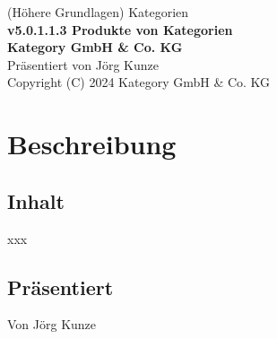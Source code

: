 \documentclass[a4paper]{amsart}
\theoremstyle{definition}
\begin{document}
\begin{titlepage}
\centering
{\huge
(Höhere Grundlagen) Kategorien\\[1cm]
\textbf{v5.0.1.1.3 Produkte von Kategorien}
}\\[1cm]

\textbf{Kategory GmbH \& Co. KG}\\
Präsentiert von Jörg Kunze\\
Copyright (C) 2024 Kategory GmbH \& Co. KG

\end{titlepage}

%

\newpage

\section*{Beschreibung}

\subsection*{Inhalt}
xxx

\subsection*{Präsentiert}
Von Jörg Kunze
\end{document}
